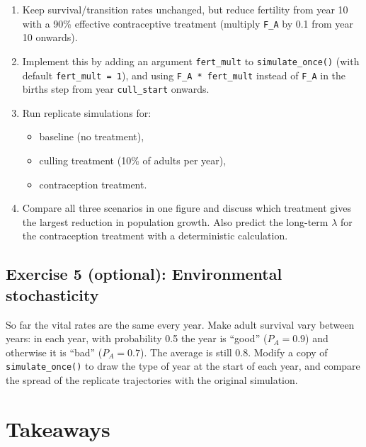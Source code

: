 \documentclass[
  a4paper]{book}
\providecommand{\tightlist}{%
  \setlength{\itemsep}{0pt}\setlength{\parskip}{0pt}}
\begin{document}
\begin{enumerate}
\def\labelenumi{\arabic{enumi}.}
\tightlist
\item
  Keep survival/transition rates unchanged, but reduce fertility from year 10 with a 90\% effective contraceptive treatment (multiply \texttt{F\_A} by 0.1 from year 10 onwards).
\item
  Implement this by adding an argument \texttt{fert\_mult} to \texttt{simulate\_once()} (with default \texttt{fert\_mult\ =\ 1}), and using \texttt{F\_A\ *\ fert\_mult} instead of \texttt{F\_A} in the births step from year \texttt{cull\_start} onwards.
\item
  Run replicate simulations for:

  \begin{itemize}
  \tightlist
  \item
    baseline (no treatment),
  \item
    culling treatment (10\% of adults per year),
  \item
    contraception treatment.
  \end{itemize}
\item
  Compare all three scenarios in one figure and discuss which treatment gives the largest reduction in population growth. Also predict the long-term \(\lambda\) for the contraception treatment with a deterministic calculation.
\end{enumerate}

\subsection{Exercise 5 (optional): Environmental stochasticity}\label{exercise-5-optional-environmental-stochasticity}

So far the vital rates are the same every year. Make adult survival vary between years: in each year, with probability 0.5 the year is ``good'' (\(P_A = 0.9\)) and otherwise it is ``bad'' (\(P_A = 0.7\)). The average is still 0.8. Modify a copy of \texttt{simulate\_once()} to draw the type of year at the start of each year, and compare the spread of the replicate trajectories with the original simulation.

\section{Takeaways}\label{takeaways-13}
\end{document}
